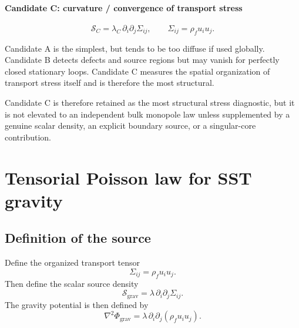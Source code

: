 \documentclass[11pt]{article}
\newcommand{\rhoF}{\rho_{\!f}}
\newcommand{\grav}{\mathrm{grav}}
\begin{document}
            \paragraph{Candidate C: curvature / convergence of transport stress}
                \begin{equation}
                    \mathcal{S}_C = \lambda_C\, \partial_i\partial_j \Sigma_{ij},
                    \qquad
                    \Sigma_{ij}=\rhoF u_i u_j.
                    \label{eq:SC}
                \end{equation}
                
                Candidate A is the simplest, but tends to be too diffuse if used globally. Candidate B detects defects and source regions but may vanish for perfectly closed stationary loops. Candidate C measures the spatial organization of transport stress itself and is therefore the most structural.
                
                Candidate C is therefore retained as the most structural stress diagnostic,
                but it is not elevated to an independent bulk monopole law unless supplemented by
                a genuine scalar density, an explicit boundary source, or a singular-core
                contribution.
        
        \section{Tensorial Poisson law for SST gravity}
        
        \subsection{Definition of the source}
            
            Define the organized transport tensor
            \begin{equation}
                \Sigma_{ij} = \rhoF u_i u_j.
                \label{eq:Sigmaij-repeat}
            \end{equation}
            Then define the scalar source density
            \begin{equation}
                \boxed{
                    \mathcal{S}_{\grav}
                    =
                    \lambda\, \partial_i\partial_j \Sigma_{ij}.
                }
                \label{eq:Sgrav-tensor}
            \end{equation}
            The gravity potential is then defined by
            \begin{equation}
                \boxed{
                    \nabla^2 \Phi_{\grav}
                    =
                    \lambda\,\partial_i\partial_j(\rhoF u_i u_j).
                }
                \label{eq:poisson-tensor}
            \end{equation}
        
\end{document}
